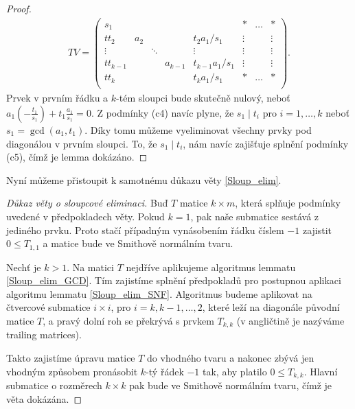 \begin{proof}
\begin{align*}
TV =
    \left(
    \begin{array}{ccccc|ccc}
        s_1        &     &        &         &                 & \ast   & \hdots & \ast   \\
        tt_2       & a_2 &        &         & t_2 a_1/s_1     & \vdots &        & \vdots \\
        \vdots     &     & \ddots &         & \vdots          & \vdots &        & \vdots \\
        tt_{k - 1} &     &        & a_{k-1} & t_{k-1} a_1/s_1 & \vdots &        & \vdots \\
        tt_k       &     &        &         & t_k a_1/s_1     & \ast   & \hdots & \ast \\
    \end{array}
    \right)
.
\end{align*}
Prvek v prvním řádku a $ k $-tém sloupci bude skutečně nulový, neboť
$ a_1(-\frac{t_1}{s_1}) + t_1 \frac{a_1}{s_1} = 0 $. Z podmínky (c4) navíc plyne,
že $ s_1 \mid t_i $ pro $ i = 1,\dots, k $ neboť $ s_1 = \gcd(a_1, t_1) $.
Díky tomu můžeme vyeliminovat všechny prvky pod diagonálou v prvním sloupci.
To, že $ s_1 \mid t_i $, nám navíc zajišťuje splnění podmínky (c5), čímž je lemma
dokázáno.
\end{proof}

Nyní můžeme přistoupit k samotnému důkazu věty \ref{Sloup_elim}.
\begin{proof}[Důkaz věty o sloupcové eliminaci]
Buď $ T $ matice $ k \times m $, která splňuje podmínky uvedené v předpokladech
věty. Pokud $ k = 1 $, pak naše submatice sestává z jediného prvku. Proto
stačí případným vynásobením řádku číslem $ -1 $ zajistit $ 0 \leq T_{1,1} $
a matice bude ve Smithově normálním tvaru.

Nechť je $ k > 1 $. Na matici $ T $ nejdříve aplikujeme algoritmus lemmatu
\ref{Sloup_elim_GCD}. Tím zajistíme splnění předpokladů pro postupnou aplikaci
algoritmu lemmatu \ref{Sloup_elim_SNF}. Algoritmus budeme aplikovat na čtvercové
submatice $ i \times i $, pro $ i = k,k-1,\dots, 2 $, které leží na diagonále
původní matice $ T $, a pravý dolní roh se překrývá s prvkem $ T_{k,k} $
(v angličtině je nazýváme trailing matrices).

Takto zajistíme úpravu matice $ T $ do vhodného tvaru a nakonec zbývá jen
vhodným způsobem pronásobit $ k $-tý řádek $ -1 $ tak, aby platilo
$ 0 \leq T_{k,k} $. Hlavní submatice o rozměrech $ k \times k $ pak bude
ve Smithově normálním tvaru, čímž je věta dokázána.
\end{proof}



